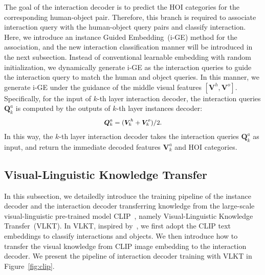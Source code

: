 \documentclass[10pt,twocolumn,letterpaper]{article}
\begin{document}
The goal of the interaction decoder is to predict the HOI categories for the corresponding human-object pair. Therefore, this branch is required to associate interaction query with the human-object query pairs and classify interaction. Here, we introduce an instance Guided Embedding~(i-GE) method for the association, and the new interaction classification manner will be introduced in the next subsection.
Instead of conventional learnable embedding with random initialization, we dynamically generate i-GE as the interaction queries to guide the interaction query to match the human and object queries.
In this manner, we generate i-GE under the guidance of the middle visual features $[\mathbf{V}^{h}, \mathbf{V}^{o}]$. Specifically, for the input of $k$-th layer interaction decoder, the interaction queries $\bm{Q}^{a}_k$ is computed by the outputs of $k$-th layer instances decoder:
\begin{equation}
\small
\begin{aligned}
\bm{Q}^{a}_k = (\bm{V}^h_k + \bm{V}^o_k) / 2.
\end{aligned}
\end{equation}
In this way, the $k$-th layer interaction decoder takes the interaction queries  $\bm{Q}^{a}_k$ as input, and return the immediate decoded features $\bm{V}^a_k$ and HOI categories.



\vspace{-1mm}\subsection{Visual-Linguistic Knowledge Transfer}\label{sec:clip}\vspace{-1mm}
In this subsection, we detailedly introduce the training pipeline of the instance decoder and the interaction decoder transferring knowledge from the large-scale visual-linguistic pre-trained model CLIP~\cite{radford2021learning}, namely Visual-Linguistic Knowledge Transfer~(VLKT). In VLKT, inspired by~\cite{jin2021object,gu2021open}, we first adopt the CLIP text embeddings to classify interactions and objects.
 We then introduce how to transfer the visual knowledge from CLIP image embedding to the interaction decoder. We present the pipeline of interaction decoder training with VLKT in Figure~\ref{fig:clip}.
\end{document}
